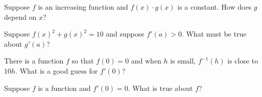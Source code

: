 \documentclass{ximera}
\newcommand{\recommendation}[1]{}
\begin{document}


\begin{problem}
  Suppose $f$ is an increasing function and $f(x) \cdot g(x)$ is a constant.  How does $g$ depend on $x$?
  \begin{multipleChoice}
  \end{multipleChoice}
\end{problem}

\begin{problem}
\recommendation{Vic}
  Suppose $f(x)^2 + g(x)^2 = 10$ and suppose $f'(a) > 0$.  What must be true about $g'(a)$?
  \begin{multipleChoice}
  \end{multipleChoice}
\end{problem}



\begin{problem}
\recommendation{Vic}
  There is a function $f$ so that $f(0) = 0$ and when $h$ is small, $f^{-1}(h)$ is close to $10 h$.  What is a good guess for $f'(0)$?
  \begin{multipleChoice}
  \end{multipleChoice}
\end{problem}

\begin{problem}
\recommendation{Vic}
  Suppose $f$ is a function and $f'(0) = 0$.  What is true about $f$?
  \begin{multipleChoice}
  \end{multipleChoice}
\end{problem}
\end{document}

